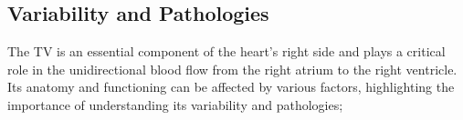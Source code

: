\subsection{Variability and Pathologies}\label{sec:varpath}
The \gls{TV} is an essential component of the heart's right side and plays a critical role in the unidirectional blood flow from the right atrium to the right ventricle. Its anatomy and functioning can be affected by various factors, highlighting the importance of understanding its variability and pathologies;

\\
